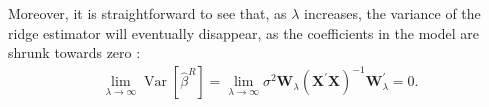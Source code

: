 \noindent Moreover, it is straightforward to see that, as $\lambda$ increases, the variance of the ridge estimator will eventually disappear, as the coefficients in the model are shrunk towards zero \cite{van2015lecture}:
\begin{align}
\label{eqn:limitvar}
\lim _{\lambda \rightarrow \infty} \operatorname{Var}[\hat{\beta}^R]=\lim _{\lambda \rightarrow \infty} \sigma^{2} \mathbf{W}_{\lambda}\left(\mathbf{X}^{\prime} \mathbf{X}\right)^{-1} \mathbf{W}_{\lambda}^{\prime}=0. 
\end{align}



